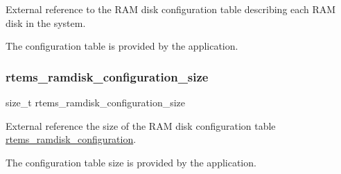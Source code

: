External reference to the R\+AM disk configuration table describing each R\+AM disk in the system. 

The configuration table is provided by the application. \mbox{\label{group__rtems__ramdisk_gae3749836b518adac705d1872e2e2e649}} 
\subsubsection{\texorpdfstring{rtems\_ramdisk\_configuration\_size}{rtems\_ramdisk\_configuration\_size}}
{\footnotesize\ttfamily size\+\_\+t rtems\+\_\+ramdisk\+\_\+configuration\+\_\+size}



External reference the size of the R\+AM disk configuration table \mbox{\hyperlink{group__rtems__ramdisk_ga3f3e285d9218984555c395ae54250e1e}{rtems\+\_\+ramdisk\+\_\+configuration}}. 

The configuration table size is provided by the application. 
